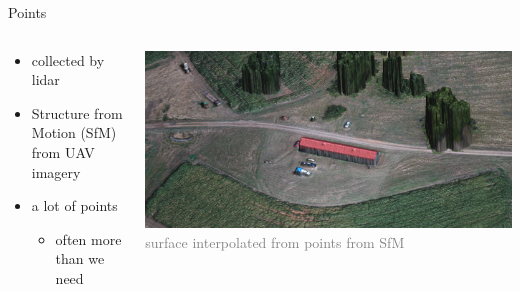 \documentclass[xcolor={dvipsnames,usenames},beamer,aspectratio=169]{beamer}
\begin{document}
\begin{frame}{Points}

\begin{columns}
\begin{column}{0.3\textwidth}

\begin{itemize}
  \item collected by lidar
  \item Structure from Motion (SfM) from UAV imagery
  \item a lot of points
  \begin{itemize}
  \item often more than we need
  \end{itemize}
\end{itemize}

\end{column}
\begin{column}{0.65\textwidth}

\begin{center}
  \includegraphics[width=\textwidth]{agisoft_detail}
  \\
  \tiny
  \textcolor{gray}{surface interpolated from points from SfM}
\end{center}

\end{column}
\end{columns}

\end{frame}
\end{document}
